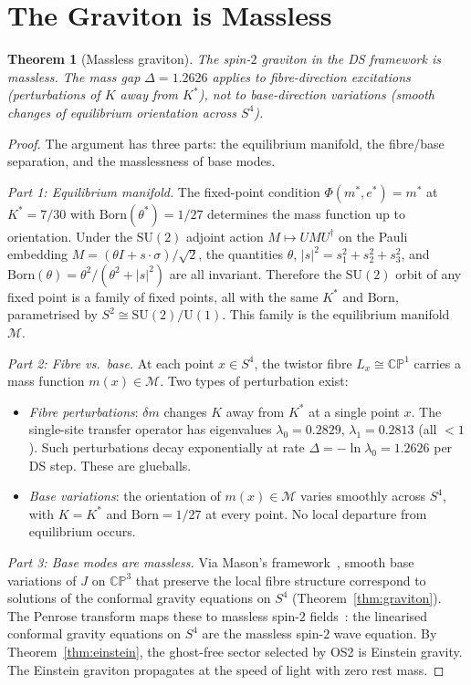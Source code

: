 \documentclass[11pt,a4paper]{article}
\newtheorem{theorem}{Theorem}[section]
\theoremstyle{definition}
\theoremstyle{remark}
\newcommand{\CP}{\mathbb{CP}}
\newcommand{\SU}{\mathrm{SU}}
\begin{document}
\section{The Graviton is Massless}\label{sec:massless_graviton}

\begin{theorem}[Massless graviton]\label{thm:massless_graviton}
The spin-$2$ graviton in the DS framework is massless. The mass gap $\Delta=1.2626$ applies to fibre-direction excitations (perturbations of $K$ away from $K^*$), not to base-direction variations (smooth changes of equilibrium orientation across $S^4$).
\end{theorem}

\begin{proof}
The argument has three parts: the equilibrium manifold, the fibre/base separation, and the masslessness of base modes.

\emph{Part 1: Equilibrium manifold.} The fixed-point condition $\Phi(m^*,e^*)=m^*$ at $K^*=7/30$ with $\mathrm{Born}(\theta^*)=1/27$ determines the mass function up to orientation. Under the $\SU(2)$ adjoint action $M\mapsto UMU^\dagger$ on the Pauli embedding $M=(\theta I+s\cdot\sigma)/\sqrt{2}$, the quantities $\theta$, $|s|^2=s_1^2+s_2^2+s_3^2$, and $\mathrm{Born}(\theta)=\theta^2/(\theta^2+|s|^2)$ are all invariant. Therefore the $\SU(2)$ orbit of any fixed point is a family of fixed points, all with the same $K^*$ and $\mathrm{Born}$, parametrised by $S^2\cong\SU(2)/\mathrm{U}(1)$. This family is the equilibrium manifold $\mathcal{M}$.

\emph{Part 2: Fibre vs.\ base.} At each point $x\in S^4$, the twistor fibre $L_x\cong\CP^1$ carries a mass function $m(x)\in\mathcal{M}$. Two types of perturbation exist:
\begin{itemize}[nosep]
\item \emph{Fibre perturbations}: $\delta m$ changes $K$ away from $K^*$ at a single point $x$. The single-site transfer operator has eigenvalues $\lambda_0=0.2829$, $\lambda_1=0.2813$ (all $<1$). Such perturbations decay exponentially at rate $\Delta=-\ln\lambda_0=1.2626$ per DS step. These are glueballs.
\item \emph{Base variations}: the orientation of $m(x)\in\mathcal{M}$ varies smoothly across $S^4$, with $K=K^*$ and $\mathrm{Born}=1/27$ at every point. No local departure from equilibrium occurs.
\end{itemize}

\emph{Part 3: Base modes are massless.} Via Mason's framework~\cite{Mason2005}, smooth base variations of $J$ on $\CP^3$ that preserve the local fibre structure correspond to solutions of the conformal gravity equations on $S^4$ (Theorem~\ref{thm:graviton}). The Penrose transform maps these to massless spin-$2$ fields~\cite{AHS1978,LeBrunMason}: the linearised conformal gravity equations on $S^4$ are the massless spin-$2$ wave equation. By Theorem~\ref{thm:einstein}, the ghost-free sector selected by OS2 is Einstein gravity. The Einstein graviton propagates at the speed of light with zero rest mass.


\end{proof}
\end{document}

